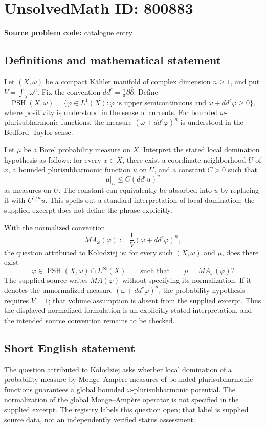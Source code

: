 \documentclass[11pt]{article}
\begin{document}
\section*{UnsolvedMath ID: 800883}
\textbf{Source problem code:} catalogue entry
\subsection{Definitions and mathematical statement}
Let \((X,\omega)\) be a compact K\"ahler manifold of complex dimension \(n\geq 1\), and put \(V=\int_X\omega^n\). Fix the convention \(dd^c=\frac{i}{\pi}\partial\bar\partial\). Define
\[
\operatorname{PSH}(X,\omega)=\{\varphi\in L^1(X):\varphi\text{ is upper semicontinuous and }\omega+dd^c\varphi\geq 0\},
\]
where positivity is understood in the sense of currents. For bounded \(\omega\)-plurisubharmonic functions, the measure \((\omega+dd^c\varphi)^n\) is understood in the Bedford--Taylor sense.

Let \(\mu\) be a Borel probability measure on \(X\). Interpret the stated local domination hypothesis as follows: for every \(x\in X\), there exist a coordinate neighborhood \(U\) of \(x\), a bounded plurisubharmonic function \(u\) on \(U\), and a constant \(C>0\) such that
\[
\mu|_U\leq C(dd^c u)^n
\]
as measures on \(U\). The constant can equivalently be absorbed into \(u\) by replacing it with \(C^{1/n}u\). This spells out a standard interpretation of local domination; the supplied excerpt does not define the phrase explicitly.

With the normalized convention
\[
MA_\omega(\varphi):=\frac{1}{V}(\omega+dd^c\varphi)^n,
\]
the question attributed to Ko\l{}odziej is: for every such \((X,\omega)\) and \(\mu\), does there exist
\[
\varphi\in\operatorname{PSH}(X,\omega)\cap L^\infty(X)
\qquad\text{such that}\qquad
\mu=MA_\omega(\varphi)?
\]
The supplied source writes \(MA(\varphi)\) without specifying its normalization. If it denotes the unnormalized measure \((\omega+dd^c\varphi)^n\), the probability hypothesis requires \(V=1\); that volume assumption is absent from the supplied excerpt. Thus the displayed normalized formulation is an explicitly stated interpretation, and the intended source convention remains to be checked.
\subsection{Short English statement}
The question attributed to Ko\l{}odziej asks whether local domination of a probability measure by Monge--Amp\`ere measures of bounded plurisubharmonic functions guarantees a global bounded \(\omega\)-plurisubharmonic potential. The normalization of the global Monge--Amp\`ere operator is not specified in the supplied excerpt. The registry labels this question open; that label is supplied source data, not an independently verified status assessment.
\end{document}
